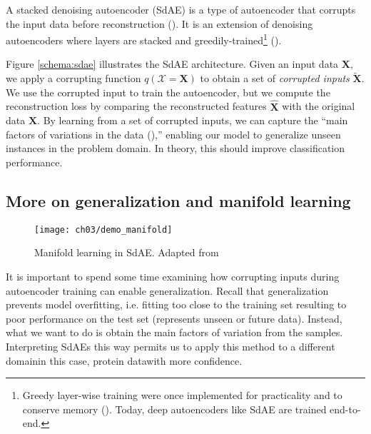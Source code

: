 \par A stacked denoising autoencoder (SdAE) is a type of autoencoder that
corrupts the input data before reconstruction (\cite{vincent2010stacked}). It
is an extension of denoising autoencoders where layers are stacked and
greedily-trained\footnote{Greedy layer-wise training were once implemented
for practicality and to conserve memory (\cite{bengio2007greedy}). Today,
deep autoencoders like SdAE are trained end-to-end.}
(\cite{vincent2008denoising}).

\par Figure \ref{schema:sdae} illustrates the SdAE architecture. Given an
input data $\mathbf{X}$, we apply a corrupting function
$q(\mathcal{X}=\mathbf{X})$ to obtain a set of \textit{corrupted inputs}
$\mathbf{\widetilde{X}}$. We use the corrupted input to train the
autoencoder, but we compute the reconstruction loss by comparing the
reconstructed features $\mathbf{\widehat{X}}$ with the original data
$\mathbf{X}$. By learning from a set of corrupted inputs, we can capture the
``main factors of variations in the data (\cite{vincent2008denoising}),''
enabling our model to generalize unseen instances in the problem domain.
In theory, this should improve classification performance.

\subsection{More on generalization and manifold learning}

\begin{wrapfigure}{r}{0.5\textwidth}
  \centering
  \texttt{[image: ch03/demo\_manifold]}
  \caption[Manifold demonstration in SdAE]{Manifold learning in SdAE. Adapted
  from \cite{vincent2008denoising}}
  \label{demo:manifold}
\end{wrapfigure}

\par It is important to spend some time examining how corrupting inputs
during autoencoder training can enable generalization. Recall that
generalization prevents model overfitting, i.e. fitting too close to the
training set resulting to poor performance on the test set (represents unseen
or future data). Instead, what we want to do is obtain the main factors of
variation from the samples. Interpreting SdAEs this way permits us to apply
this method to a different domain\textemdash in this case, protein
data\textemdash with more confidence.

